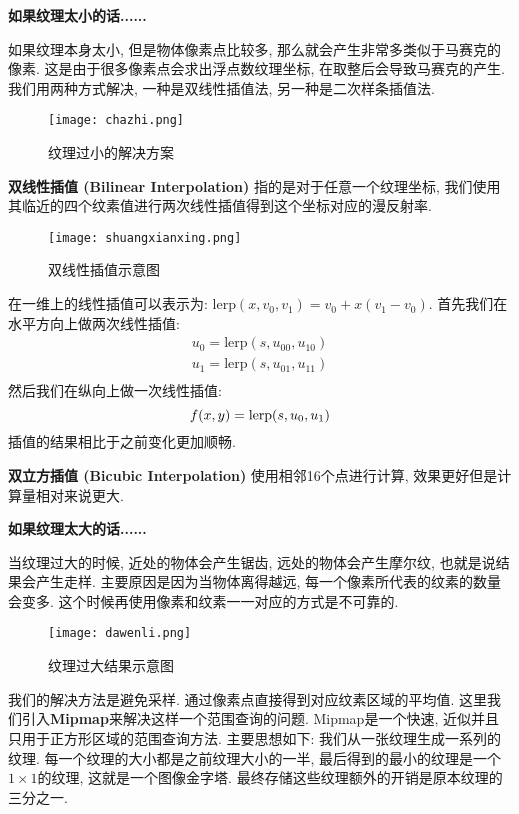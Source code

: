 \textbf{如果纹理太小的话......}

如果纹理本身太小, 但是物体像素点比较多, 那么就会产生非常多类似于马赛克的像素. 这是由于很多像素点会求出浮点数纹理坐标, 在取整后会导致马赛克的产生. 我们用两种方式解决, 一种是双线性插值法, 另一种是二次样条插值法. 
\begin{figure}[H]
	\centering
	\texttt{[image: chazhi.png]}
	\caption{纹理过小的解决方案}
	\label{fig:chazhi}
\end{figure}

\textbf{双线性插值 (Bilinear Interpolation) }指的是对于任意一个纹理坐标, 我们使用其临近的四个纹素值进行两次线性插值得到这个坐标对应的漫反射率. 

\begin{figure}[H]
	\centering
	\texttt{[image: shuangxianxing.png]}
	\caption{双线性插值示意图}
	\label{fig:shuangxianxing}
\end{figure}
在一维上的线性插值可以表示为: $\text{lerp}(x,v_0,v_1)=v_0+x(v_1-v_0)$. 首先我们在水平方向上做两次线性插值: 
\begin{equation}
	\begin{split}
		u_0 = \text{lerp}(s,u_{00},u_{10})\\
		u_1 = \text{lerp}(s,u_{01},u_{11})\\
	\end{split}
\end{equation}
然后我们在纵向上做一次线性插值: 
\begin{equation}
		f(x,y) = \text{lerp}(s,u_{0},u_{1})\\
\end{equation}
插值的结果相比于之前变化更加顺畅. 

\textbf{双立方插值 (Bicubic Interpolation) }使用相邻16个点进行计算, 效果更好但是计算量相对来说更大. 

\textbf{如果纹理太大的话......}

当纹理过大的时候, 近处的物体会产生锯齿, 远处的物体会产生摩尔纹, 也就是说结果会产生走样. 主要原因是因为当物体离得越远, 每一个像素所代表的纹素的数量会变多. 这个时候再使用像素和纹素一一对应的方式是不可靠的. 
\begin{figure}[H]
	\centering
	\texttt{[image: dawenli.png]}
	\caption{纹理过大结果示意图}
	\label{fig:dawenli}
\end{figure}
我们的解决方法是避免采样. 通过像素点直接得到对应纹素区域的平均值. 这里我们引入\textbf{Mipmap}来解决这样一个范围查询的问题. Mipmap是一个快速, 近似并且只用于正方形区域的范围查询方法. 主要思想如下: 我们从一张纹理生成一系列的纹理. 每一个纹理的大小都是之前纹理大小的一半, 最后得到的最小的纹理是一个$1\times 1$的纹理, 这就是一个图像金字塔. 最终存储这些纹理额外的开销是原本纹理的三分之一. 

